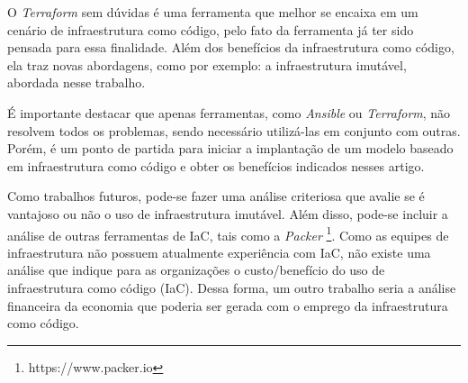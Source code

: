 O \textit{Terraform} sem dúvidas é uma ferramenta que melhor se encaixa em um cenário de infraestrutura como código, pelo fato da ferramenta já ter sido pensada para essa finalidade. Além dos benefícios da infraestrutura como código, ela traz novas abordagens, como por exemplo: a infraestrutura imutável, abordada nesse trabalho.

É importante destacar que apenas ferramentas, como \textit{Ansible} ou \textit{Terraform}, não resolvem todos os problemas, sendo necessário utilizá-las em conjunto com outras. Porém, é um ponto de partida para iniciar a implantação de um modelo baseado em infraestrutura como código e obter os benefícios indicados nesses artigo.

Como trabalhos futuros, pode-se fazer uma análise criteriosa que avalie se é vantajoso ou não o uso de infraestrutura imutável. Além disso, pode-se incluir a análise de outras ferramentas de IaC, tais como a \textit{Packer} \footnote{https://www.packer.io}. 
Como as equipes de infraestrutura não possuem atualmente experiência com IaC, não existe uma análise que indique para as organizações o custo/benefício do uso de infraestrutura como código (IaC). Dessa forma, um outro trabalho seria a análise financeira da economia que poderia ser gerada com o emprego da infraestrutura como código.





